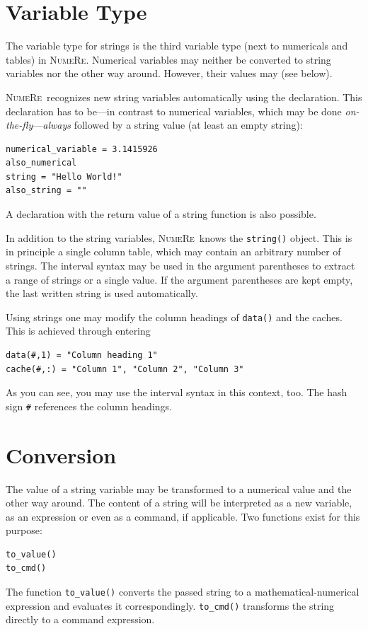 \documentclass[DIV=14,headsepline,footsepline]{scrbook}
\newcommand{\NR}{\textsc{Nu\-me\-Re}}
\begin{document}
			\section{Variable Type}
				The variable type for strings is the third variable type (next to numericals and tables) in \NR. Numerical variables may neither be converted to string variables nor the other way around. However, their values may (see below).
				
				\NR\ recognizes new string variables automatically using the declaration. This declaration has to be---in contrast to numerical variables, which may be done \emph{on-the-fly}---\emph{always} followed by a string value (at least an empty string):
				\begin{lstlisting}
numerical_variable = 3.1415926
also_numerical
string = "Hello World!"
also_string = ""
				\end{lstlisting}
				A declaration with the return value of a string function is also possible.
				
				In addition to the string variables, \NR\ knows the \lstinline+string()+ object. This is in principle a single column table, which may contain an arbitrary number of strings. The interval syntax may be used in the argument parentheses to extract a range of strings or a single value. If the argument parentheses are kept empty, the last written string is used automatically.
				
				Using strings one may modify the column headings of \lstinline+data()+ and the caches. This is achieved through entering
				\begin{lstlisting}
data(#,1) = "Column heading 1"
cache(#,:) = "Column 1", "Column 2", "Column 3"
				\end{lstlisting}
				As you can see, you may use the interval syntax in this context, too. The hash sign \lstinline+#+ references the column headings.
				
			\section{Conversion}
				The value of a string variable may be transformed to a numerical value and the other way around. The content of a string will be interpreted as a new variable, as an expression or even as a command, if applicable. Two functions exist for this purpose:
				\begin{lstlisting}
to_value()
to_cmd()
				\end{lstlisting}
				The function \lstinline+to_value()+ converts the passed string to a ma\-the\-ma\-tic\-al-nu\-me\-ri\-cal expression and evaluates it correspondingly. \lstinline+to_cmd()+ transforms the string directly to a command expression.
				
\end{document}
